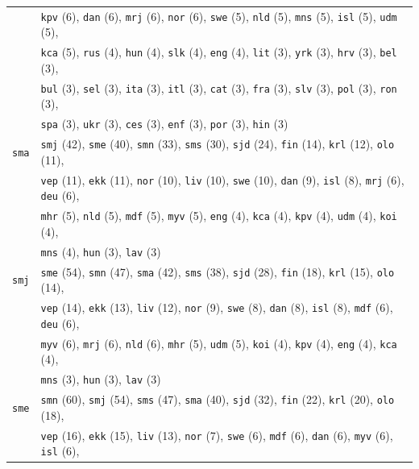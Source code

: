 \begin{center}
\begin{longtable}{ll}
 & \texttt{kpv} (6), \texttt{dan} (6), \texttt{mrj} (6), \texttt{nor} (6), \texttt{swe} (5), \texttt{nld} (5), \texttt{mns} (5), \texttt{isl} (5), \texttt{udm} (5),\\
 & \texttt{kca} (5), \texttt{rus} (4), \texttt{hun} (4), \texttt{slk} (4), \texttt{eng} (4), \texttt{lit} (3), \texttt{yrk} (3), \texttt{hrv} (3), \texttt{bel} (3),\\
 & \texttt{bul} (3), \texttt{sel} (3), \texttt{ita} (3), \texttt{itl} (3), \texttt{cat} (3), \texttt{fra} (3), \texttt{slv} (3), \texttt{pol} (3), \texttt{ron} (3),\\
 & \texttt{spa} (3), \texttt{ukr} (3), \texttt{ces} (3), \texttt{enf} (3), \texttt{por} (3), \texttt{hin} (3) \\
\texttt{sma} & \texttt{smj} (42), \texttt{sme} (40), \texttt{smn} (33), \texttt{sms} (30), \texttt{sjd} (24), \texttt{fin} (14), \texttt{krl} (12), \texttt{olo} (11),\\
 & \texttt{vep} (11), \texttt{ekk} (11), \texttt{nor} (10), \texttt{liv} (10), \texttt{swe} (10), \texttt{dan} (9), \texttt{isl} (8), \texttt{mrj} (6), \texttt{deu} (6),\\
 & \texttt{mhr} (5), \texttt{nld} (5), \texttt{mdf} (5), \texttt{myv} (5), \texttt{eng} (4), \texttt{kca} (4), \texttt{kpv} (4), \texttt{udm} (4), \texttt{koi} (4),\\
 & \texttt{mns} (4), \texttt{hun} (3), \texttt{lav} (3) \\
\texttt{smj} & \texttt{sme} (54), \texttt{smn} (47), \texttt{sma} (42), \texttt{sms} (38), \texttt{sjd} (28), \texttt{fin} (18), \texttt{krl} (15), \texttt{olo} (14),\\
 & \texttt{vep} (14), \texttt{ekk} (13), \texttt{liv} (12), \texttt{nor} (9), \texttt{swe} (8), \texttt{dan} (8), \texttt{isl} (8), \texttt{mdf} (6), \texttt{deu} (6),\\
 & \texttt{myv} (6), \texttt{mrj} (6), \texttt{nld} (6), \texttt{mhr} (5), \texttt{udm} (5), \texttt{koi} (4), \texttt{kpv} (4), \texttt{eng} (4), \texttt{kca} (4),\\
 & \texttt{mns} (3), \texttt{hun} (3), \texttt{lav} (3) \\
\texttt{sme} & \texttt{smn} (60), \texttt{smj} (54), \texttt{sms} (47), \texttt{sma} (40), \texttt{sjd} (32), \texttt{fin} (22), \texttt{krl} (20), \texttt{olo} (18),\\
 & \texttt{vep} (16), \texttt{ekk} (15), \texttt{liv} (13), \texttt{nor} (7), \texttt{swe} (6), \texttt{mdf} (6), \texttt{dan} (6), \texttt{myv} (6), \texttt{isl} (6),\\

\end{longtable}
\end{center}
